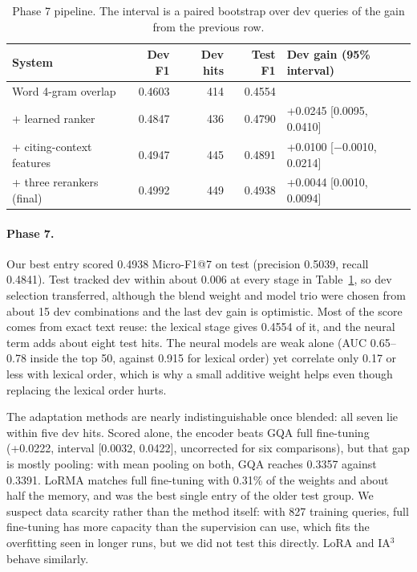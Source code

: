 \begin{table}[H]
\centering\small
\caption{Phase 7 pipeline. The interval is a paired bootstrap over dev queries of the gain from the previous row.}
\label{tab:p7steps}
\begin{tabular}{lrrrl}
\toprule
System & Dev F1 & Dev hits & Test F1 & Dev gain (95\% interval) \\
\midrule
Word 4-gram overlap & 0.4603 & 414 & 0.4554 & \\
+ learned ranker & 0.4847 & 436 & 0.4790 & +0.0245 [0.0095, 0.0410] \\
+ citing-context features & 0.4947 & 445 & 0.4891 & +0.0100 [$-$0.0010, 0.0214] \\
+ three rerankers (final) & 0.4992 & 449 & 0.4938 & +0.0044 [0.0010, 0.0094] \\
\bottomrule
\end{tabular}
\end{table}

\paragraph{Phase 7.} Our best entry scored 0.4938 Micro-F1@7 on test (precision 0.5039, recall 0.4841). Test tracked dev within about 0.006 at every stage in Table~\ref{tab:p7steps}, so dev selection transferred, although the blend weight and model trio were chosen from about 15 dev combinations and the last dev gain is optimistic. Most of the score comes from exact text reuse: the lexical stage gives 0.4554 of it, and the neural term adds about eight test hits. The neural models are weak alone (AUC 0.65--0.78 inside the top 50, against 0.915 for lexical order) yet correlate only 0.17 or less with lexical order, which is why a small additive weight helps even though replacing the lexical order hurts.

The adaptation methods are nearly indistinguishable once blended: all seven lie within five dev hits. Scored alone, the encoder beats GQA full fine-tuning (+0.0222, interval [0.0032, 0.0422], uncorrected for six comparisons), but that gap is mostly pooling: with mean pooling on both, GQA reaches 0.3357 against 0.3391. LoRMA \cite{bihany2025lorma} matches full fine-tuning with 0.31\% of the weights and about half the memory, and was the best single entry of the older test group. We suspect data scarcity rather than the method itself: with 827 training queries, full fine-tuning has more capacity than the supervision can use, which fits the overfitting seen in longer runs, but we did not test this directly. LoRA \cite{hu2022lora} and IA$^3$ \cite{liu2022ia3} behave similarly.

